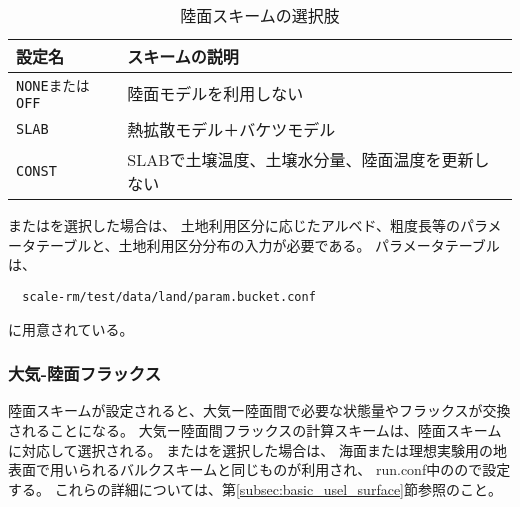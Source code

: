 \\

\\

\begin{table}[h]
\begin{center}
  \caption{陸面スキームの選択肢}
  \label{tab:nml_land}
  \begin{tabularx}{150mm}{lX} \hline
    \rowcolor[gray]{0.9}  設定名 & スキームの説明 \\ \hline
      \verb|NONEまたはOFF| & 陸面モデルを利用しない                       \\
      \verb|SLAB|          & 熱拡散モデル＋バケツモデル                    \\
      \verb|CONST|         & SLABで土壌温度、土壌水分量、陸面温度を更新しない \\
    \hline
  \end{tabularx}
\end{center}
\end{table}


またはを選択した場合は、
土地利用区分に応じたアルベド、粗度長等のパラメータテーブルと、土地利用区分分布の入力が必要である。
パラメータテーブルは、
\begin{verbatim}
  scale-rm/test/data/land/param.bucket.conf
\end{verbatim}
に用意されている。\\


\subsubsection{大気-陸面フラックス}
陸面スキームが設定されると、大気ー陸面間で必要な状態量やフラックスが交換されることになる。
大気ー陸面間フラックスの計算スキームは、陸面スキームに対応して選択される。
またはを選択した場合は、
海面または理想実験用の地表面で用いられるバルクスキームと同じものが利用され、
run.conf中のので設定する。
これらの詳細については、第\ref{subsec:basic_usel_surface}節参照のこと。\\



